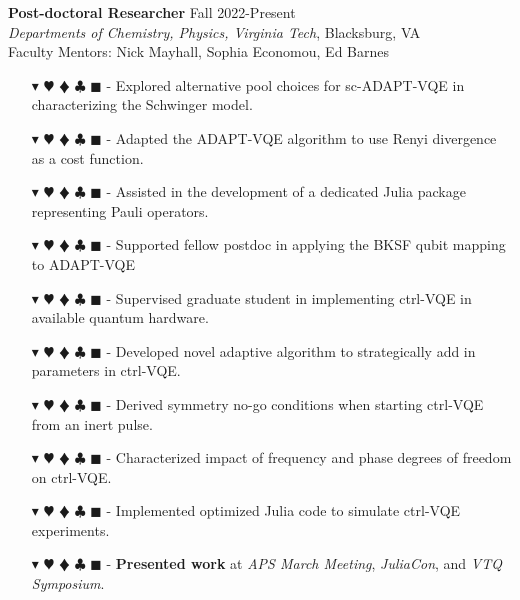 \documentclass[overlapped, 10pt]{res} %
\newcommand{\physics}{$\blacktriangledown$}
\newcommand{\biochem}{$\varheartsuit$}
\newcommand{\shannon}{$\vardiamondsuit$}
\newcommand{\classic}{$\clubsuit$}
\newcommand{\quantum}{$\blacksquare$}
\newcommand{\physicscolor}{\color{YellowOrange}}
\newcommand{\biochemcolor}{\color{Emerald}}
\newcommand{\shannoncolor}{\color{Goldenrod}}
\newcommand{\classiccolor}{\color{Cyan}}
\newcommand{\quantumcolor}{\color{RedOrange}}
\newcommand{\tag}[1]{
    {\IfSubStr{#1}{\physics}{\physicscolor}{\color{White}}\physics}
    {\IfSubStr{#1}{\biochem}{\biochemcolor}{\color{White}}\biochem}
    {\IfSubStr{#1}{\shannon}{\shannoncolor}{\color{White}}\shannon}
    {\IfSubStr{#1}{\classic}{\classiccolor}{\color{White}}\classic}
    {\IfSubStr{#1}{\quantum}{\quantumcolor}{\color{White}}\quantum}
}
\begin{document}
\begin{resume}
\textbf{Post-doctoral Researcher} \hfill Fall 2022-Present \\
\textit{Departments of Chemistry, Physics, Virginia Tech}, Blacksburg, VA \\
Faculty Mentors: Nick Mayhall, Sophia Economou, Ed Barnes
\begin{itemize} \itemsep -2pt %
\item[\tag{\physics\biochem\classic\quantum}-] Explored alternative pool choices for sc-ADAPT-VQE in characterizing the Schwinger model.
\item[\tag{\physics\biochem\classic\quantum}-] Adapted the ADAPT-VQE algorithm to use Renyi divergence as a cost function.
\item[\tag{\physics\biochem\classic\quantum}-] Assisted in the development of a dedicated Julia package representing Pauli operators.
\item[\tag{\physics\biochem\classic\quantum}-] Supported fellow postdoc in applying the BKSF qubit mapping to ADAPT-VQE
\item[\tag{\physics\biochem\classic\quantum}-] Supervised graduate student in implementing ctrl-VQE in available quantum hardware.
\item[\tag{\physics\biochem\classic\quantum}-] Developed novel adaptive algorithm to strategically add in parameters in ctrl-VQE.
\item[\tag{\physics\biochem\classic\quantum}-] Derived symmetry no-go conditions when starting ctrl-VQE from an inert pulse.
\item[\tag{\physics\biochem\classic\quantum}-] Characterized impact of frequency and phase degrees of freedom on ctrl-VQE.
\item[\tag{\physics\biochem\classic\quantum}-] Implemented optimized Julia code to simulate ctrl-VQE experiments.
\item[\tag{}-] \textbf{Presented work} at \textit{APS March Meeting}, \textit{JuliaCon}, and \textit{VTQ Symposium}.
\end{itemize}


\end{resume}
\end{document}
